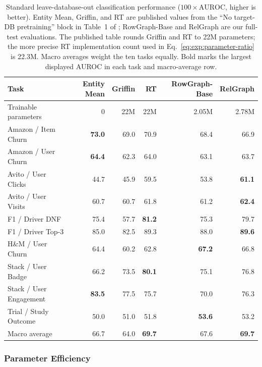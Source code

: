 \begin{table}[t]
  \centering
  \caption{Standard leave-database-out classification performance
  (\(100\times\mathrm{AUROC}\), higher is better). Entity Mean, Griffin,
  and RT are published values from the ``No target-DB pretraining'' block
  in Table~1 of \citet{ranjan2026rt}; RowGraph-Base and RelGraph are our
  full-test evaluations. The published table rounds Griffin and RT to 22M
  parameters; the more precise RT implementation count used in
  Eq.~\eqref{eq:exp:parameter-ratio} is 22.3M. Macro averages weight the ten
  tasks equally. Bold marks the largest displayed AUROC in each task and
  macro-average row.}
  \label{tab:exp:standard-results}
  \footnotesize
  \setlength{\tabcolsep}{3.5pt}
  \begin{tabular}{lrrrrr}
    \toprule
    Task & Entity Mean & Griffin & RT & RowGraph-Base & RelGraph \\
    \midrule
    Trainable parameters & 0 & 22M & 22M & 2.05M & 2.78M \\
    \midrule
    Amazon / Item Churn
      & \textbf{73.0} & 69.0 & 70.9 & 68.4 & 66.9 \\
    Amazon / User Churn
      & \textbf{64.4} & 62.3 & 64.0 & 63.1 & 63.7 \\
    Avito / User Clicks
      & 44.7 & 45.9 & 59.5 & 53.8 & \textbf{61.1} \\
    Avito / User Visits
      & 60.7 & 60.7 & 61.8 & 61.2 & \textbf{62.4} \\
    F1 / Driver DNF
      & 75.4 & 57.7 & \textbf{81.2} & 75.3 & 79.7 \\
    F1 / Driver Top-3
      & 85.0 & 82.5 & 89.3 & 88.0 & \textbf{89.6} \\
    H\&M / User Churn
      & 64.4 & 60.2 & 62.8 & \textbf{67.2} & 66.8 \\
    Stack / User Badge
      & 66.2 & 73.5 & \textbf{80.1} & 75.1 & 76.8 \\
    Stack / User Engagement
      & \textbf{83.5} & 77.5 & 75.7 & 70.0 & 76.3 \\
    Trial / Study Outcome
      & 50.0 & 51.0 & 51.8 & \textbf{53.6} & 53.2 \\
    \midrule
    Macro average
      & 66.7 & 64.0 & \textbf{69.7} & 67.6 & \textbf{69.7} \\
    \bottomrule
  \end{tabular}
\end{table}

\subsubsection{Parameter Efficiency}
\label{sec:exp:parameter-efficiency}

